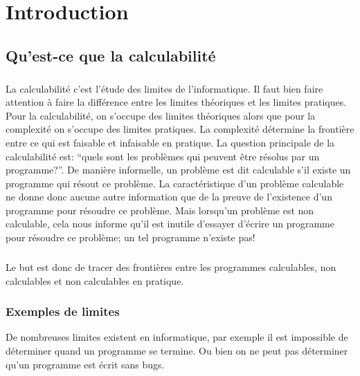 
\chapter{Introduction}
\label{ch:introduction}

\section{Qu'est-ce que la calculabilité}
\label{sec:qu_est-ce_la_calculabilite}

\paragraph{}

La calculabilité c'est l'étude des limites de l'informatique. Il faut bien
faire attention à faire la différence entre les limites théoriques et les limites
pratiques. Pour la calculabilité, on s'occupe des limites théoriques alors que pour 
la complexité on s'occupe des limites pratiques. La complexité
détermine la frontière entre ce qui est faisable et infaisable en pratique.
La question principale de la calculabilité est: ``quels sont les problèmes qui peuvent
être résolus par un programme?''.  De manière informelle, un problème est dit calculable s'il existe un programme qui résout ce problème.  La caractéristique d'un problème calculable ne donne donc aucune 
autre information que de la preuve de l'existence d'un programme pour résoudre ce problème.  Mais lorsqu'un problème est non calculable, cela nous informe qu'il est inutile d'essayer d'écrire un programme pour résoudre ce problème; un tel programme n'existe pas!

\paragraph{} Le but est donc de tracer des frontières entre les programmes calculables,
non calculables et non calculables en pratique.

\subsection{Exemples de limites}
\label{subsec:exemples_limites}

De nombreuses limites existent en informatique, par exemple il est impossible de déterminer quand un programme se termine. Ou bien on ne peut pas déterminer qu'un programme est écrit sans bugs.

